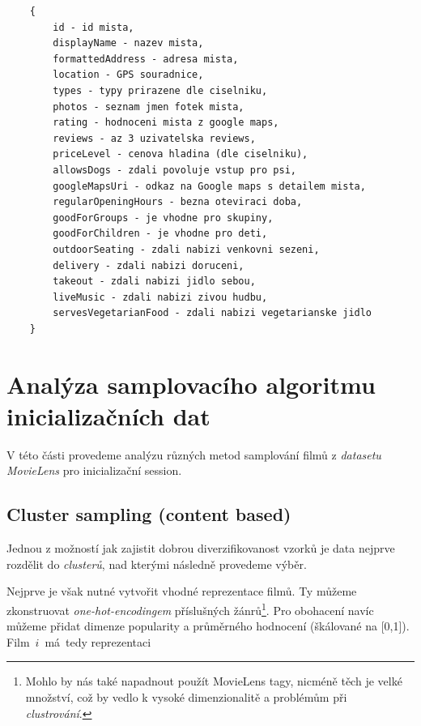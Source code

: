 \documentclass[12pt,a4paper]{report}
\begin{document}
\begin{listing}[H]
    \begin{lstlisting}
    {
        id - id mista,
        displayName - nazev mista,
        formattedAddress - adresa mista,
        location - GPS souradnice,
        types - typy prirazene dle ciselniku,
        photos - seznam jmen fotek mista,
        rating - hodnoceni mista z google maps,
        reviews - az 3 uzivatelska reviews,
        priceLevel - cenova hladina (dle ciselniku),
        allowsDogs - zdali povoluje vstup pro psi,
        googleMapsUri - odkaz na Google maps s detailem mista,
        regularOpeningHours - bezna oteviraci doba,
        goodForGroups - je vhodne pro skupiny,
        goodForChildren - je vhodne pro deti,
        outdoorSeating - zdali nabizi venkovni sezeni,
        delivery - zdali nabizi doruceni,
        takeout - zdali nabizi jidlo sebou,
        liveMusic - zdali nabizi zivou hudbu,
        servesVegetarianFood - zdali nabizi vegetarianske jidlo
    }
\end{lstlisting}
\caption{Struktura \textit{body} dotazu pro \textit{Places text search (New)} API.}
\label{prog3:usedFieldMaskFields}
\end{listing}



\clearpage

\section{Analýza samplovacího algoritmu inicializačních dat}
\label{initSamplingAlgorithmAnalysis}
V této části provedeme analýzu různých metod
samplování filmů z \textit{datasetu MovieLens} pro inicializační session.

\subsection{Cluster sampling (content based)}
Jednou z možností jak zajistit
dobrou diverzifikovanost vzorků
je data nejprve rozdělit do \textit{clusterů},
nad kterými následně provedeme výběr.

Nejprve je však nutné vytvořit vhodné
reprezentace filmů. Ty můžeme zkonstruovat
\textit{one-hot-encodingem} příslušných
žánrů\footnote{Mohlo by nás také napadnout použít MovieLens tagy,
nicméně těch je velké množství, což by vedlo k
vysoké dimenzionalitě a problémům při \textit{clustrování}.}.
Pro obohacení navíc můžeme přidat
dimenze popularity a průměrného hodnocení
(škálované na [0,1]).
Film~$i$~má~tedy reprezentaci
\end{document}
